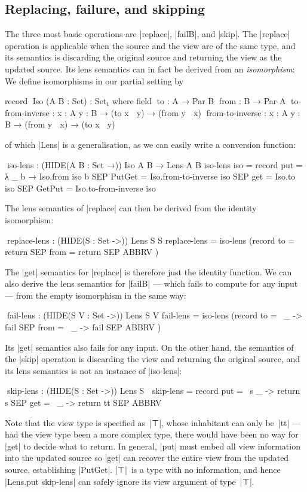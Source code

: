 \documentclass[fleqn]{llncs}
\renewcommand{\emph}{\textsl}
\begin{document}
\subsection{Replacing, failure, and skipping}
\label{sec:basic-lenses}

The three most basic operations are |replace|, |failB|, and |skip|.
The |replace| operation is applicable when the source and the view are of the same type, and its semantics is discarding the original source and returning the view as the updated source.
Its lens semantics can in fact be derived from an \emph{isomorphism}:
We define isomorphisms in our partial setting by
\begin{code}
record ^^^Iso (A B : Set) : Set₁ where
  field
    ^^^to    : A → Par B
    ^^^from  : B → Par A
    ^^^to-from-inverse  : {x : A} {y : B} → (to x ↦ y) → (from y ↦ x)
    ^^^from-to-inverse  : {x : A} {y : B} → (from y ↦ x) → (to x ↦ y)
\end{code}
of which |Lens| is a generalisation, as we can easily write a conversion function:
\begin{code}
^^^iso-lens : (HIDE({A B : Set} →)) Iso A B → Lens A B
iso-lens iso = record
  {    put  = λ _ b → Iso.from iso b  SEP PutGet  = Iso.from-to-inverse iso
  SEP  get  = Iso.to iso              SEP GetPut  = Iso.to-from-inverse iso }
\end{code}
The lens semantics of |replace| can then be derived from the identity isomorphism:
\begin{code}
^^^replace-lens : (HIDE({S : Set} ->)) Lens S S
replace-lens = iso-lens (record {to = return SEP from = return SEP ABBRV })
\end{code}
The |get| semantics for |replace| is therefore just the identity function.
We can also derive the lens semantics for |failB| --- which fails to compute for any input --- from the empty isomorphism in the same way:
\begin{code}
^^^fail-lens : (HIDE({S V : Set} ->)) Lens S V
fail-lens = iso-lens (record {to = \ _ -> fail SEP from = \ _ -> fail SEP ABBRV })
\end{code}
Its |get| semantics also fails for any input.
On the other hand, the semantics of the |skip| operation is discarding the view and returning the original source, and its lens semantics is not an instance of |iso-lens|:
\begin{code}
^^^skip-lens : (HIDE({S : Set} ->)) Lens S ⊤
skip-lens = record { put = \ s _ -> return s SEP get = \ _ -> return tt SEP ABBRV }
\end{code}
Note that the view type is specified as~|⊤|, whose inhabitant can only be~|tt| --- had the view type been a more complex type, there would have been no way for |get| to decide what to return.
In general, |put| must embed all view information into the updated source so |get| can recover the entire view from the updated source, establishing |PutGet|.
|⊤|~is a type with no information, and hence |Lens.put skip-lens| can safely ignore its view argument of type~|⊤|.
\end{document}
